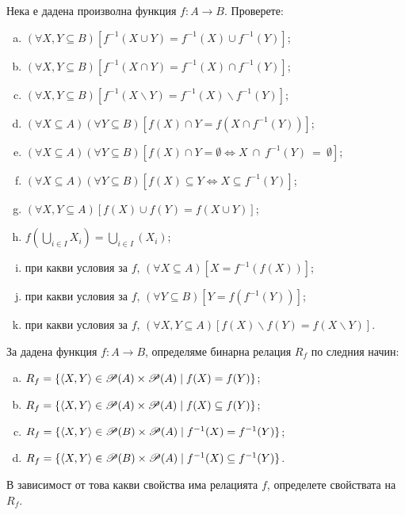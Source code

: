 \begin{problem}
  Нека е дадена произволна функция $f:A \to B$.
  Проверете:
  \begin{enumerate}[a)]
  \item
    $(\forall X,Y \subseteq B)[f^{-1}(X\cup Y) = f^{-1}(X)\cup f^{-1}(Y)]$;
  \item
    $(\forall X,Y \subseteq B)[f^{-1}(X\cap Y) = f^{-1}(X)\cap f^{-1}(Y)]$;
  \item
    $(\forall X,Y \subseteq B)[f^{-1}(X\backslash Y) = f^{-1}(X)\backslash f^{-1}(Y)]$;
  \item
    $(\forall X\subseteq A)(\forall Y\subseteq B)[f(X)\cap Y = f(X\cap f^{-1}(Y))]$;
  \item
    $(\forall X \subseteq A)(\forall Y \subseteq B)[f(X)\cap Y = \emptyset \iff  X~\cap~f^{-1}(Y)~=~\emptyset]$;
  \item
    $(\forall X \subseteq A)(\forall Y \subseteq B)[f(X)\subseteq Y \iff X\subseteq f^{-1}(Y)]$;
  \item
    $(\forall X,Y \subseteq A)[f(X)\cup f(Y) = f(X\cup Y)]$;
  \item
    $f(\bigcup_{i\in I}X_i) = \bigcup_{i\in I}(X_i)$;
  \item
    при какви условия за $f$,
    $(\forall X\subseteq A)[X =  f^{-1}(f(X))]$;
  \item
    при какви условия за $f$,
    $(\forall Y \subseteq B)[Y = f(f^{-1}(Y))]$;
  \item
    при какви условия за $f$,
    $(\forall X,Y \subseteq A)[f(X)\backslash f(Y) = f(X\backslash Y)]$.
  \end{enumerate}
\end{problem}

\begin{problem}
  За дадена функция $f:A \to B$, определяме бинарна релация $R_f$ по следния начин:
  \begin{enumerate}[a)]
  \item
    $R_f = \{\langle{X,Y}\rangle \in \mathscr{P}(A) \times \mathscr{P}(A) \mid f(X) = f(Y)\}$;
  \item
    $R_f = \{\langle{X,Y}\rangle \in \mathscr{P}(A) \times \mathscr{P}(A) \mid f(X) \subseteq f(Y)\}$;
  \item
    $R_f = \{\langle{X,Y}\rangle \in \mathscr{P}(B) \times \mathscr{P}(A) \mid f^{-1}(X) = f^{-1}(Y)\}$;
  \item
    $R_f = \{\langle{X,Y}\rangle \in \mathscr{P}(B) \times \mathscr{P}(A) \mid f^{-1}(X) \subseteq f^{-1}(Y)\}$.
  \end{enumerate}
  В зависимост от това какви свойства има релацията $f$, определете свойствата на $R_f$.
\end{problem}

